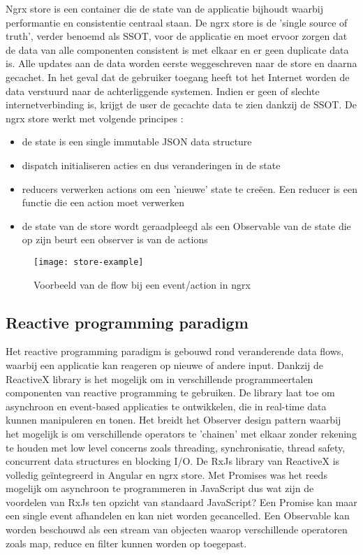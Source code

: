Ngrx store is een container die de state van de applicatie bijhoudt waarbij performantie en consistentie centraal staan. De ngrx store is de 'single source of truth', verder benoemd als SSOT, voor de applicatie en moet ervoor zorgen dat de data van alle componenten consistent is met elkaar en er geen duplicate data is. Alle updates aan de data worden eerste weggeschreven naar de store en daarna gecachet. In het geval dat de gebruiker toegang heeft tot het Internet worden de data verstuurd naar de achterliggende systemen. Indien er geen of slechte internetverbinding is, krijgt de user de gecachte data te zien dankzij de SSOT. De ngrx store werkt met volgende \autocite{ngrx-info} principes :
\begin{itemize}  
\item de state is een single immutable JSON data structure
\item dispatch initialiseren acties en dus veranderingen in de state
\item reducers verwerken actions om een 'nieuwe' state te cre\"een. Een reducer is een functie die een action moet verwerken
\item de state van de store wordt geraadpleegd als een Observable van de state die op zijn beurt een observer is van de actions
\end{itemize}
\begin{figure}[h]
\caption{Voorbeeld van de flow bij een event/action in ngrx}
\centering
\texttt{[image: store-example]}
\end{figure}
\subsection{Reactive programming paradigm}
Het reactive programming paradigm \autocite{reactivex-intro} is gebouwd rond veranderende data flows, waarbij een applicatie kan reageren op nieuwe of andere input. Dankzij de ReactiveX library is het mogelijk om in verschillende programmeertalen componenten van reactive programming te gebruiken. De library laat toe om asynchroon en event-based applicaties te ontwikkelen, die in real-time data kunnen manipuleren en tonen. Het breidt het Observer design pattern waarbij het mogelijk is om verschillende operators te 'chainen' met elkaar zonder rekening te houden met low level concerns zoals threading, synchronisatie, thread safety, concurrent data structures en blocking I/O. De RxJs library van ReactiveX is volledig ge\"integreerd in Angular en ngrx store. Met Promises \autocite{promise-info} was het reeds mogelijk om asynchroon te programmeren in JavaScript dus wat zijn de voordelen van RxJs ten opzicht van standaard JavaScript? Een Promise kan maar een single event afhandelen en kan niet worden gecancelled. Een Observable kan worden beschouwd als een stream van objecten waarop verschillende operatoren zoals map, reduce en filter kunnen worden op toegepast.
